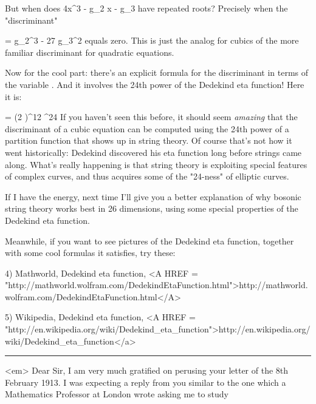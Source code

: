 But when does 4x^{3} - g_{2} x - g_{3} have
repeated roots?  Precisely when the "discriminant"

\Delta  = g_{2}^{3} - 27 g_{3}^{2} 
equals zero.  This is just the analog for cubics of the more familiar
discriminant for quadratic equations.  

Now for the cool part: there's an explicit formula for the discriminant
in terms of the variable \tau .  And it involves the 24th power of the 
Dedekind eta function!  Here it is:

                     \Delta  = (2 \pi )^{12} \eta ^{24} 
If you haven't seen this before, it should seem \emph{amazing} that the
discriminant of a cubic equation can be computed using the 24th power of
a partition function that shows up in string theory.  Of course that's
not how it went historically: Dedekind discovered his eta function long
before strings came along.  What's really happening is that string
theory is exploiting special features of complex curves, and thus acquires
some of the "24-ness" of elliptic curves.

If I have the energy, next time I'll give you a better explanation of
why bosonic string theory works best in 26 dimensions, using some
special properties of the Dedekind eta function.

Meanwhile, if you want to see pictures of the Dedekind eta function,
together with some cool formulas it satisfies, try these:

4) Mathworld, Dedekind eta function, 
<A HREF = "http://mathworld.wolfram.com/DedekindEtaFunction.html">http://mathworld.wolfram.com/DedekindEtaFunction.html</A>

5) Wikipedia, Dedekind eta function,
<A HREF = "http://en.wikipedia.org/wiki/Dedekind_eta_function">http://en.wikipedia.org/wiki/Dedekind_eta_function</a>



 \par\noindent\rule{\textwidth}{0.4pt}
<em>
Dear Sir,
I am very much gratified on perusing your letter of the 8th
February 1913.  I was expecting a reply from you similar to the one
which a Mathematics Professor at London wrote asking me to study


